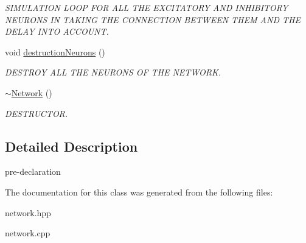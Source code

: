 \begin{DoxyCompactItemize}
\begin{DoxyCompactList}\small\item\em S\-I\-M\-U\-L\-A\-T\-I\-O\-N L\-O\-O\-P F\-O\-R A\-L\-L T\-H\-E E\-X\-C\-I\-T\-A\-T\-O\-R\-Y A\-N\-D I\-N\-H\-I\-B\-I\-T\-O\-R\-Y N\-E\-U\-R\-O\-N\-S I\-N T\-A\-K\-I\-N\-G T\-H\-E C\-O\-N\-N\-E\-C\-T\-I\-O\-N B\-E\-T\-W\-E\-E\-N T\-H\-E\-M A\-N\-D T\-H\-E D\-E\-L\-A\-Y I\-N\-T\-O A\-C\-C\-O\-U\-N\-T. \end{DoxyCompactList}\item 
\hypertarget{classNetwork_af768e3ca6edc80ac02932f5df8065a62}{void \hyperlink{classNetwork_af768e3ca6edc80ac02932f5df8065a62}{destruction\-Neurons} ()}\label{classNetwork_af768e3ca6edc80ac02932f5df8065a62}

\begin{DoxyCompactList}\small\item\em D\-E\-S\-T\-R\-O\-Y A\-L\-L T\-H\-E N\-E\-U\-R\-O\-N\-S O\-F T\-H\-E N\-E\-T\-W\-O\-R\-K. \end{DoxyCompactList}\item 
\hypertarget{classNetwork_a7a4e19cdb4bf0c7ecf82baa643831492}{\hyperlink{classNetwork_a7a4e19cdb4bf0c7ecf82baa643831492}{$\sim$\-Network} ()}\label{classNetwork_a7a4e19cdb4bf0c7ecf82baa643831492}

\begin{DoxyCompactList}\small\item\em D\-E\-S\-T\-R\-U\-C\-T\-O\-R. \end{DoxyCompactList}\end{DoxyCompactItemize}


\subsection{Detailed Description}
pre-\/declaration 

The documentation for this class was generated from the following files\-:\begin{DoxyCompactItemize}
\item 
network.\-hpp\item 
network.\-cpp\end{DoxyCompactItemize}
